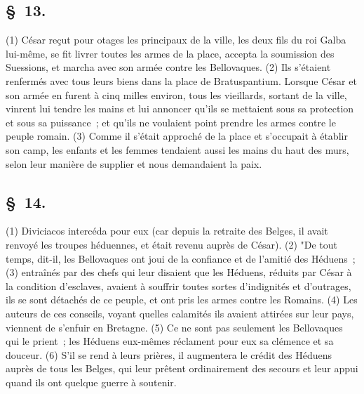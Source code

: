 \documentclass[french,twoside]{book} %
\begin{document}
\subsection[{§ 13.}]{ \textsc{§ 13.} }
\noindent (1) César reçut pour otages les principaux de la ville, les deux fils du roi Galba lui-même, se fit livrer toutes les armes de la place, accepta la soumission des Suessions, et marcha avec son armée contre les Bellovaques. (2) Ils s’étaient renfermés avec tous leurs biens dans la place de Bratuspantium. Lorsque César et son armée en furent à cinq milles environ, tous les vieillards, sortant de la ville, vinrent lui tendre les mains et lui annoncer qu’ils se mettaient sous sa protection et sous sa puissance ; et qu’ils ne voulaient point prendre les armes contre le peuple romain. (3) Comme il s’était approché de la place et s’occupait à établir son camp, les enfants et les femmes tendaient aussi les mains du haut des murs, selon leur manière de supplier et nous demandaient la paix.
\subsection[{§ 14.}]{ \textsc{§ 14.} }
\noindent (1) Diviciacos intercéda pour eux (car depuis la retraite des Belges, il avait renvoyé les troupes héduennes, et était revenu auprès de César). (2) "De tout temps, dit-il, les Bellovaques ont joui de la confiance et de l’amitié des Héduens ; (3) entraînés par des chefs qui leur disaient que les Héduens, réduits par César à la condition d’esclaves, avaient à souffrir toutes sortes d’indignités et d’outrages, ils se sont détachés de ce peuple, et ont pris les armes contre les Romains. (4) Les auteurs de ces conseils, voyant quelles calamités ils avaient attirées sur leur pays, viennent de s’enfuir en Bretagne. (5) Ce ne sont pas seulement les Bellovaques qui le prient ; les Héduens eux-mêmes réclament pour eux sa clémence et sa douceur. (6) S'il se rend à leurs prières, il augmentera le crédit des Héduens auprès de tous les Belges, qui leur prêtent ordinairement des secours et leur appui quand ils ont quelque guerre à soutenir.
\end{document}
